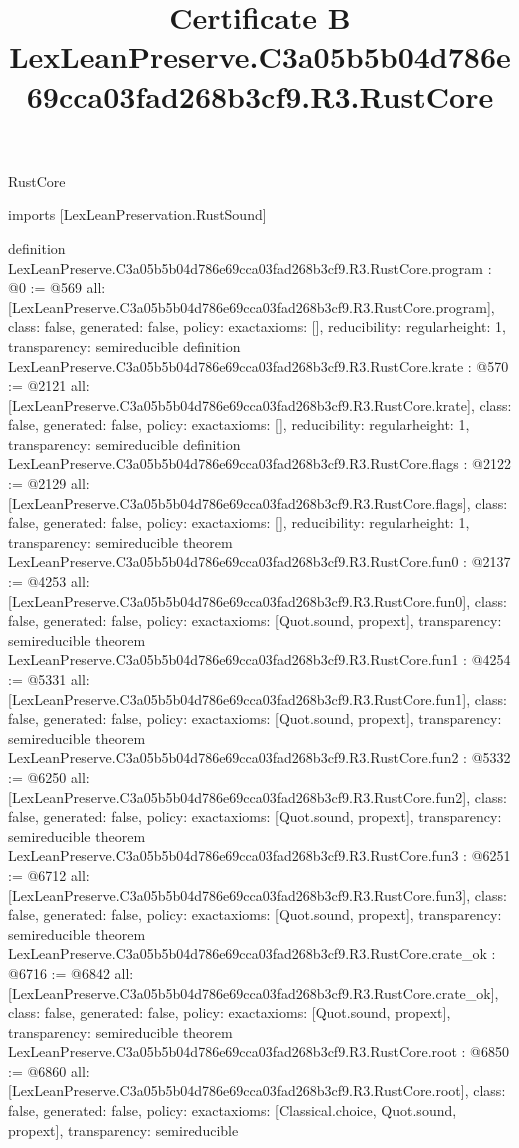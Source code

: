 \begin{lexlean}{RustCore}
\title{Certificate B LexLeanPreserve.C3a05b5b04d786e69cca03fad268b3cf9.R3.RustCore}
\begin{coremodule}
imports [LexLeanPreservation.RustSound]

definition LexLeanPreserve.C3a05b5b04d786e69cca03fad268b3cf9.R3.RustCore.program : @0 := @569 {
  all: [LexLeanPreserve.C3a05b5b04d786e69cca03fad268b3cf9.R3.RustCore.program],
  class: false,
  generated: false,
  policy: exact{axioms: []},
  reducibility: regular{height: 1},
  transparency: semireducible
}
definition LexLeanPreserve.C3a05b5b04d786e69cca03fad268b3cf9.R3.RustCore.krate : @570 := @2121 {
  all: [LexLeanPreserve.C3a05b5b04d786e69cca03fad268b3cf9.R3.RustCore.krate],
  class: false,
  generated: false,
  policy: exact{axioms: []},
  reducibility: regular{height: 1},
  transparency: semireducible
}
definition LexLeanPreserve.C3a05b5b04d786e69cca03fad268b3cf9.R3.RustCore.flags : @2122 := @2129 {
  all: [LexLeanPreserve.C3a05b5b04d786e69cca03fad268b3cf9.R3.RustCore.flags],
  class: false,
  generated: false,
  policy: exact{axioms: []},
  reducibility: regular{height: 1},
  transparency: semireducible
}
theorem LexLeanPreserve.C3a05b5b04d786e69cca03fad268b3cf9.R3.RustCore.fun0 : @2137 := @4253 {
  all: [LexLeanPreserve.C3a05b5b04d786e69cca03fad268b3cf9.R3.RustCore.fun0],
  class: false,
  generated: false,
  policy: exact{axioms: [Quot.sound, propext]},
  transparency: semireducible
}
theorem LexLeanPreserve.C3a05b5b04d786e69cca03fad268b3cf9.R3.RustCore.fun1 : @4254 := @5331 {
  all: [LexLeanPreserve.C3a05b5b04d786e69cca03fad268b3cf9.R3.RustCore.fun1],
  class: false,
  generated: false,
  policy: exact{axioms: [Quot.sound, propext]},
  transparency: semireducible
}
theorem LexLeanPreserve.C3a05b5b04d786e69cca03fad268b3cf9.R3.RustCore.fun2 : @5332 := @6250 {
  all: [LexLeanPreserve.C3a05b5b04d786e69cca03fad268b3cf9.R3.RustCore.fun2],
  class: false,
  generated: false,
  policy: exact{axioms: [Quot.sound, propext]},
  transparency: semireducible
}
theorem LexLeanPreserve.C3a05b5b04d786e69cca03fad268b3cf9.R3.RustCore.fun3 : @6251 := @6712 {
  all: [LexLeanPreserve.C3a05b5b04d786e69cca03fad268b3cf9.R3.RustCore.fun3],
  class: false,
  generated: false,
  policy: exact{axioms: [Quot.sound, propext]},
  transparency: semireducible
}
theorem LexLeanPreserve.C3a05b5b04d786e69cca03fad268b3cf9.R3.RustCore.crate_ok : @6716 := @6842 {
  all: [LexLeanPreserve.C3a05b5b04d786e69cca03fad268b3cf9.R3.RustCore.crate_ok],
  class: false,
  generated: false,
  policy: exact{axioms: [Quot.sound, propext]},
  transparency: semireducible
}
theorem LexLeanPreserve.C3a05b5b04d786e69cca03fad268b3cf9.R3.RustCore.root : @6850 := @6860 {
  all: [LexLeanPreserve.C3a05b5b04d786e69cca03fad268b3cf9.R3.RustCore.root],
  class: false,
  generated: false,
  policy: exact{axioms: [Classical.choice, Quot.sound, propext]},
  transparency: semireducible
}


\end{coremodule}
\end{lexlean}
